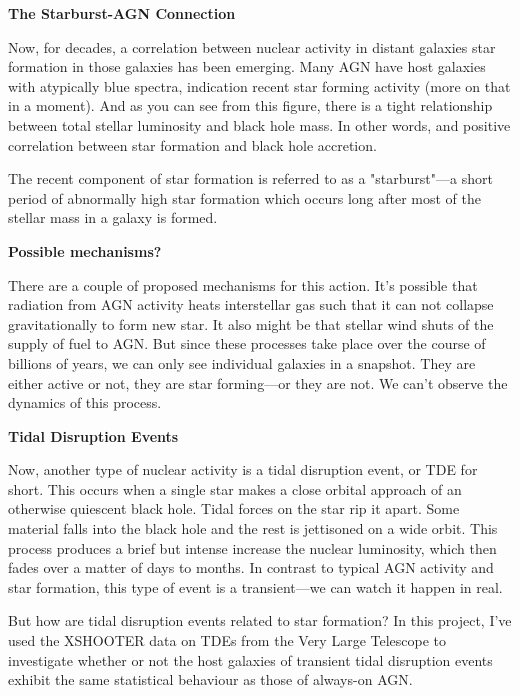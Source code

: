 \documentclass[a4paper,11pt]{article}
\begin{document}
\noindent \newline \textbf{The Starburst-AGN Connection}

\noindent \newline Now, for decades, a correlation between nuclear activity in distant galaxies
star formation in those galaxies has been emerging. Many AGN have host galaxies
with atypically blue spectra, indication recent star forming activity (more on
that in a moment). And as you can see from this figure, there is a tight relationship
between total stellar luminosity and black hole mass. In other words, and positive
correlation between star formation and black hole accretion.

\noindent \newline The recent component of star formation is referred to as a "starburst"---a
short period of abnormally high star formation which occurs long after most of
the stellar mass in a galaxy is formed.

\noindent \newline \textbf{Possible mechanisms?}

\noindent \newline There are a couple of proposed mechanisms for this action. It's possible that
radiation from AGN activity heats interstellar gas such that it can not collapse
gravitationally to form new star. It also might be that stellar wind shuts of
the supply of fuel to AGN. But since these processes take place over the course
of billions of years, we can only see individual galaxies in a snapshot. They
are either active or not, they are star forming---or they are not. We can't
observe the dynamics of this process.

\noindent \newline \textbf{Tidal Disruption Events}

\noindent \newline Now, another type of nuclear activity is a tidal disruption event, or TDE for short.
This occurs when a single star makes a close orbital approach of an otherwise
quiescent black hole. Tidal forces on the star rip it apart. Some material falls
into the black hole and the rest is jettisoned on a wide orbit. This process
produces a brief but intense increase the nuclear luminosity, which then fades
over a matter of days to months. In contrast to typical AGN activity and star
formation, this type of event is a transient---we can watch it happen in real.

\noindent \newline But how are tidal disruption events related to star formation? In this project,
I've used the XSHOOTER data on TDEs from the Very Large Telescope to investigate
whether or not the host galaxies of transient tidal disruption events exhibit
the same statistical behaviour as those of always-on AGN.
\end{document}

